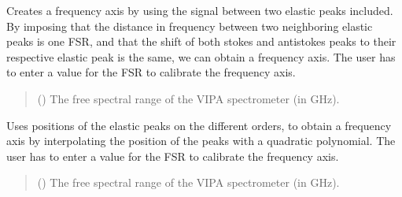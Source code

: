 \documentclass[letterpaper,10pt,english]{sphinxmanual}
\begin{document}
\begin{fulllineitems}
\begin{fulllineitems}
\label{\detokenize{_autosummary/HDF5_BLS.analyze:HDF5_BLS.analyze.Analyze_VIPA.interpolate_between_one_order}}
\pysigstartsignatures
\pysiglinewithargsret
{}
{}
{}
\pysigstopsignatures
\sphinxAtStartPar
Creates a frequency axis by using the signal between two elastic peaks included. By imposing that the distance in frequency between two neighboring elastic peaks is one FSR, and that the shift of both stokes and anti\sphinxhyphen{}stokes peaks to their respective elastic peak is the same, we can obtain a frequency axis. The user has to enter a value for the FSR to calibrate the frequency axis.
\begin{quote}\begin{description}
\sphinxAtStartPar
{} () \textendash{} The free spectral range of the VIPA spectrometer (in GHz).

\end{description}\end{quote}

\end{fulllineitems}


\begin{fulllineitems}
\label{\detokenize{_autosummary/HDF5_BLS.analyze:HDF5_BLS.analyze.Analyze_VIPA.interpolate_elastic}}
\pysigstartsignatures
\pysiglinewithargsret
{}
{}
{}
\pysigstopsignatures
\sphinxAtStartPar
Uses positions of the elastic peaks on the different orders, to obtain a frequency axis by interpolating the position of the peaks with a quadratic polynomial. The user has to enter a value for the FSR to calibrate the frequency axis.
\begin{quote}\begin{description}
\sphinxAtStartPar
{} () \textendash{} The free spectral range of the VIPA spectrometer (in GHz).


\end{description}
\end{quote}
\end{fulllineitems}
\end{fulllineitems}
\end{document}

